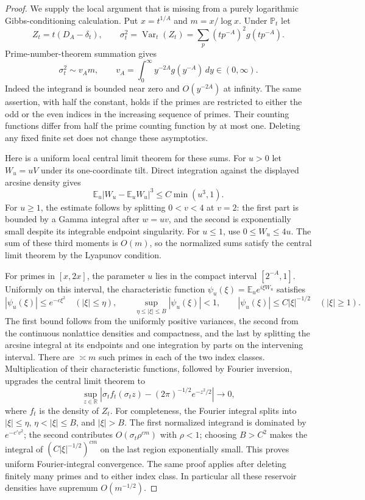 \documentclass[11pt,letterpaper]{article}
\theoremstyle{definition}
\theoremstyle{remark}
\newcommand{\1}{\mathbf 1}
\begin{document}
\begin{proof}
We supply the local argument that is missing from a purely logarithmic
Gibbs-conditioning calculation.  Put $x=t^{1/A}$ and $m=x/\log x$.
Under $\mathbb P_t$ let
\[
 Z_t=t(D_A-\delta_t),\qquad
 \sigma_t^2=\operatorname{Var}_t(Z_t)
 =\sum_p(tp^{-A})^2g(tp^{-A}).
\]
Prime-number-theorem summation gives
\begin{equation}\label{p05:eq:hard-prime-variance}
 \sigma_t^2\sim v_A m,
 \qquad v_A=\int_0^\infty y^{-2A}g(y^{-A})\,dy\in(0,\infty).
\end{equation}
Indeed the integrand is bounded near zero and $O(y^{-2A})$ at
infinity.  The same assertion, with half the constant, holds if the
primes are restricted to either the odd or the even indices in the
increasing sequence of primes.  Their counting functions differ from
half the prime counting function by at most one.  Deleting any fixed
finite set does not change these asymptotics.

Here is a uniform local central limit theorem for these sums.  For
$u>0$ let $W_u=uV$ under its one-coordinate tilt.  Direct integration
against the displayed arcsine density gives
\[
 \mathbb E_u|W_u-\mathbb E_uW_u|^3
 \le C\min(u^3,1).
\]
For $u\ge1$, the estimate follows by splitting $0<v<4$ at $v=2$:
the first part is bounded by a Gamma integral after $w=uv$, and the
second is exponentially small despite its integrable endpoint
singularity.  For $u\le1$, use $0\le W_u\le4u$.
The sum of these third moments is $O(m)$, so the normalized sums
satisfy the central limit theorem by the Lyapunov condition.

For primes in $[x,2x]$, the parameter $u$ lies in the compact
interval $[2^{-A},1]$.  Uniformly on this interval, the characteristic
function $\psi_u(\xi)=\mathbb E_u e^{i\xi W_u}$ satisfies
\[
 |\psi_u(\xi)|\le e^{-c\xi^2}\quad(|\xi|\le\eta),
 \qquad
 \sup_{\eta\le|\xi|\le B}|\psi_u(\xi)|<1,
 \qquad
 |\psi_u(\xi)|\le C|\xi|^{-1/2}\quad(|\xi|\ge1).
\]
The first bound follows from the uniformly positive variances, the
second from the continuous nonlattice densities and compactness,
and the last by splitting the arcsine integral at its endpoints
and one integration by parts on the intervening interval.
There are $\asymp m$ such primes in each of the two index classes.
Multiplication of their characteristic functions, followed by Fourier
inversion, upgrades the central limit theorem to
\begin{equation}\label{p05:eq:hard-prime-local-limit}
 \sup_{z\in\mathbb R}
 \left|\sigma_t f_t(\sigma_t z)
       -(2\pi)^{-1/2}e^{-z^2/2}\right|\longrightarrow0,
\end{equation}
where $f_t$ is the density of $Z_t$.
For completeness, the Fourier integral splits into
$|\xi|\le\eta$, $\eta<|\xi|\le B$, and $|\xi|>B$.
The first normalized integrand is dominated by $e^{-c'v^2}$;
the second contributes $O(\sigma_t\rho^{cm})$ with $\rho<1$;
choosing $B>C^2$ makes the integral of
$(C|\xi|^{-1/2})^{cm}$ on the last region exponentially small.
This proves uniform Fourier-integral convergence.
The same proof applies after deleting finitely many primes and to
either index class.  In particular all these reservoir densities
have supremum $O(m^{-1/2})$.


\end{proof}
\end{document}
